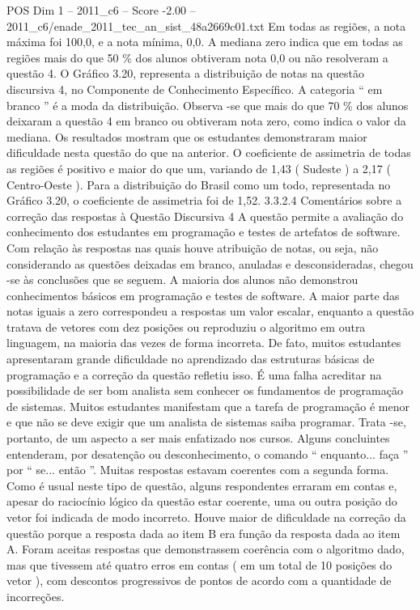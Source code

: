 \begin{textsample}{POS Dim 1 – 2011\_c6 – Score -2.00 – 2011\_c6/enade\_2011\_tec\_an\_sist\_48a2669c01.txt}
Em todas as regiões, a nota máxima foi 100,0, e a nota mínima, 0,0.
A mediana zero indica que em todas as regiões mais do que 50 \% dos alunos obtiveram nota 0,0 ou não resolveram a questão 4.
O Gráfico 3.20, representa a distribuição de notas na questão discursiva 4, no Componente de Conhecimento Específico.
A categoria “ em branco ” é a moda da distribuição.
Observa -se que mais do que 70 \% dos alunos deixaram a questão 4 em branco ou obtiveram nota zero, como indica o valor da mediana.
Os resultados mostram que os estudantes demonstraram maior dificuldade nesta questão do que na anterior.
O coeficiente de assimetria de todas as regiões é positivo e maior do que um, variando de 1,43 ( Sudeste ) a 2,17 ( Centro-Oeste ).
Para a distribuição do Brasil como um todo, representada no Gráfico 3.20, o coeficiente de assimetria foi de 1,52. 3.3.2.4 Comentários sobre a correção das respostas à Questão Discursiva 4 A questão permite a avaliação do conhecimento dos estudantes em programação e testes de artefatos de software.
Com relação às respostas nas quais houve atribuição de notas, ou seja, não considerando as questões deixadas em branco, anuladas e desconsideradas, chegou -se às conclusões que se seguem.
A maioria dos alunos não demonstrou conhecimentos básicos em programação e testes de software.
A maior parte das notas iguais a zero correspondeu a respostas um valor escalar, enquanto a questão tratava de vetores com dez posições ou reproduziu o algoritmo em outra linguagem, na maioria das vezes de forma incorreta.
De fato, muitos estudantes apresentaram grande dificuldade no aprendizado das estruturas básicas de programação e a correção da questão refletiu isso.
É uma falha acreditar na possibilidade de ser bom analista sem conhecer os fundamentos de programação de sistemas.
Muitos estudantes manifestam que a tarefa de programação é menor e que não se deve exigir que um analista de sistemas saiba programar.
Trata -se, portanto, de um aspecto a ser mais enfatizado nos cursos.
Alguns concluintes entenderam, por desatenção ou desconhecimento, o comando “ enquanto... faça ” por “ se... então ”.
Muitas respostas estavam coerentes com a segunda forma.
Como é usual neste tipo de questão, alguns respondentes erraram em contas e, apesar do raciocínio lógico da questão estar coerente, uma ou outra posição do vetor foi indicada de modo incorreto.
Houve maior de dificuldade na correção da questão porque a resposta dada ao item B era função da resposta dada ao item A.
Foram aceitas respostas que demonstrassem coerência com o algoritmo dado, mas que tivessem até quatro erros em contas ( em um total de 10 posições do vetor ), com descontos progressivos de pontos de acordo com a quantidade de incorreções.

\end{textsample}
